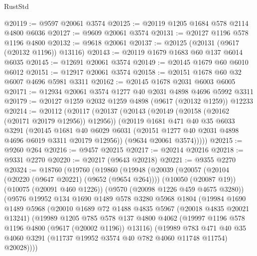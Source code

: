 \begin{lexlean}{RustStd}
\begin{coremodule}
@20119 := @9597 @20061 @3574
@20125 := @20119 @1205 @1684 @578 @2114 @4800 @6036
@20127 := @9609 @20061 @3574
@20131 := @20127 @1196 @578 @1196 @4800
@20132 := @9618 @20061
@20137 := @20125 (@20131 (@9617 (@20132 @1196)) @13116)
@20143 := @20119 @1679 @1683 @60 @137 @6014 @6035
@20145 := @12691 @20061 @3574
@20149 := @20145 @1679 @60 @6010 @6012
@20151 := @12917 @20061 @3574
@20158 := @20151 @1678 @60 @32 @6007 @4696 @5981 @3311
@20162 := @20145 @1678 @2031 @6003 @6005
@20171 := @12934 @20061 @3574 @1277 @40 @2031 @4898 @4696 @5992 @3311
@20179 := @20127 @1259 @2032 @1259 @4898 (@9617 (@20132 @1259)) @12233
@20214 := @20112
    (@20117
      (@20137
        (@20143
          (@20149 (@20158 (@20162 (@20171 @20179 @12956)) @12956))
          (@20119
            @1681
            @471
            @40
            @35
            @6033
            @3291
            (@20145
              @1681
              @40
              @6029
              @6031
              (@20151 @1277 @40 @2031 @4898 @4696 @6019 @3311 @20179 @12956))
            (@9634 @20061 @3574)))))
@20215 := @9260 @264
@20216 := @9457 @20215
@20217 := @20214 @20216
@20218 := @9331 @2270
@20220 := @20217 (@9643 @20218)
@20221 := @9355 @2270
@20324 := @18760
    (@19760
      (@19860
        (@19948
          (@20039
            (@20057
              (@20104 (@20220 (@9647 @20221) (@9652 (@9654 @264))))
              (@10050 (@20087 @19))
              (@10075 (@20091 @460 @1226))
              (@9570 (@20098 @1226 @459 @4675 @3280))
              (@9576
                @19952
                @134
                @1690
                @1489
                @578
                @3280
                @5968
                @1804
                (@19984
                  @1690
                  @1489
                  @5968
                  (@20010
                    @1689
                    @72
                    @1488
                    @4835
                    @5967
                    (@20018 @4835 @20021 @13241)
                    (@19989
                      @1205
                      @785
                      @578
                      @137
                      @4800
                      @4062
                      (@19997 @1196 @578 @1196 @4800 (@9617 (@20002 @1196)) @13116)
                      (@19989
                        @783
                        @471
                        @40
                        @35
                        @4060
                        @3291
                        (@11737 @19952 @3574 @40 @782 @4060 @11748 @11754)
                        @20028))))

\end{coremodule}
\end{lexlean}
